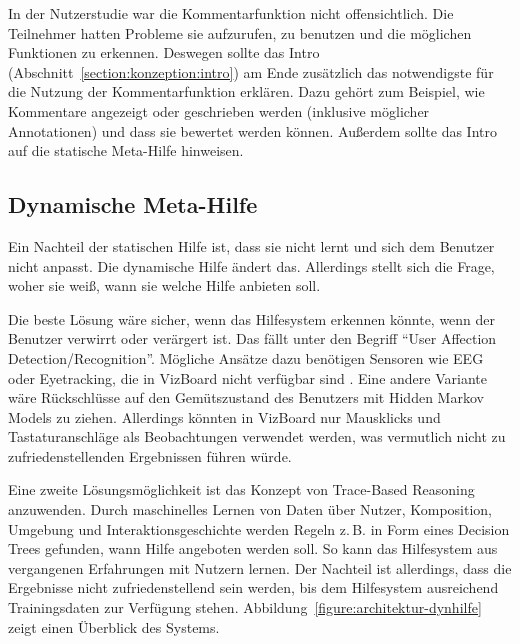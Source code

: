 \documentclass[
	headsepline,
	footsepline,
	fontsize=12pt,
	bibliography=totoc
]{scrbook}
\begin{document}
In der Nutzerstudie war die Kommentarfunktion nicht offensichtlich. Die Teilnehmer hatten Probleme sie aufzurufen, zu benutzen und die möglichen Funktionen zu erkennen. Deswegen sollte das Intro (Abschnitt~\ref{section:konzeption:intro}) am Ende zusätzlich das notwendigste für die Nutzung der Kommentarfunktion erklären. Dazu gehört zum Beispiel, wie Kommentare angezeigt oder geschrieben werden (inklusive möglicher Annotationen) und dass sie bewertet werden können. Außerdem sollte das Intro auf die statische Meta-Hilfe hinweisen.

\subsection{Dynamische Meta-Hilfe}

Ein Nachteil der statischen Hilfe ist, dass sie nicht lernt und sich dem Benutzer nicht anpasst. Die dynamische Hilfe ändert das. Allerdings stellt sich die Frage, woher sie weiß, wann sie welche Hilfe anbieten soll.


Die beste Lösung wäre sicher, wenn das Hilfesystem erkennen könnte, wenn der Benutzer verwirrt oder verärgert ist. Das fällt unter den Begriff \enquote{User Affection Detection/Recognition}. Mögliche Ansätze dazu benötigen Sensoren wie EEG oder Eyetracking, die in VizBoard nicht verfügbar sind \cite{Li2005, Liao2006}. Eine andere Variante wäre Rückschlüsse auf den Gemütszustand des Benutzers mit Hidden Markov Models \cite{Rabiner1986} zu ziehen. Allerdings könnten in VizBoard nur Mausklicks und Tastaturanschläge als Beobachtungen verwendet werden, was vermutlich nicht zu zufriedenstellenden Ergebnissen führen würde.


Eine zweite Lösungsmöglichkeit ist das Konzept von Trace-Based Reasoning \cite{Cordier2013} anzuwenden. Durch maschinelles Lernen \cite{Kotsiantis2007} von Daten über Nutzer, Komposition, Umgebung und Interaktionsgeschichte werden Regeln z.\,B. in Form eines Decision Trees gefunden, wann Hilfe angeboten werden soll. So kann das Hilfesystem aus vergangenen Erfahrungen mit Nutzern lernen. Der Nachteil ist allerdings, dass die Ergebnisse nicht zufriedenstellend sein werden, bis dem Hilfesystem ausreichend Trainingsdaten zur Verfügung stehen. Abbildung~\ref{figure:architektur-dynhilfe} zeigt einen Überblick des Systems.
\end{document}
